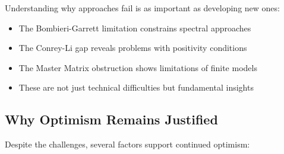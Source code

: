 \begin{lesson}
Understanding why approaches fail is as important as developing new ones:
\begin{itemize}
\item The Bombieri-Garrett limitation constrains spectral approaches
\item The Conrey-Li gap reveals problems with positivity conditions
\item The Master Matrix obstruction shows limitations of finite models
\item These are not just technical difficulties but fundamental insights
\end{itemize}
\end{lesson}

\subsection{Why Optimism Remains Justified}
\label{subsec:justified_optimism}

Despite the challenges, several factors support continued optimism:

\begin{optimism_factors}
~
\end{optimism_factors}

